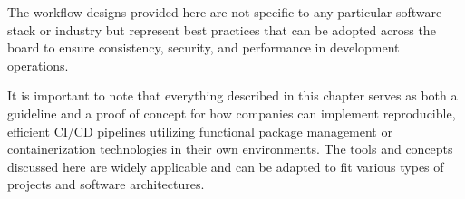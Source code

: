 The workflow designs provided here are not specific to any
particular software stack or industry but represent best practices that can be
adopted across the board to ensure consistency, security, and performance in
development operations.

It is important to note that everything described in this chapter serves as both
a guideline and a proof of concept for how companies can implement reproducible,
efficient CI/CD pipelines utilizing functional package management
or containerization technologies in their own environments.
The tools and concepts discussed
here are widely applicable and can be adapted to fit various types of projects and
software architectures.

